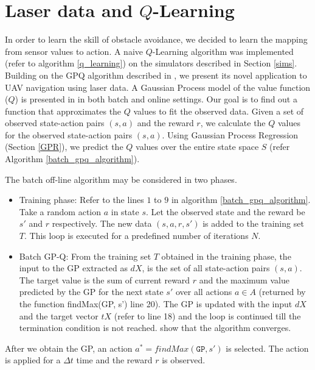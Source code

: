 \documentclass[12pt]{report}
\begin{document}
\section{Laser data and $Q$-Learning}
\label{laser_learning}
In order to learn the skill of obstacle avoidance, we decided to learn the mapping from sensor values to action. A naive $Q$-Learning algorithm was implemented (refer to algorithm \ref{q_learning}) on the simulators described in Section \ref{sims}. Building on the GPQ algorithm described in \cite{chowdhary2014off}, we present its novel application to UAV navigation using laser data.
A Gaussian Process model of the value function ($Q$) is presented in \cite{chowdhary2014off} in both batch and online settings. Our goal is to find out a function that approximates the $Q$ values to fit the observed data. Given a set of observed state-action pairs $(s,a)$ and the reward $r$, we calculate the $Q$ values for the observed state-action pairs $(s,a)$. Using Gaussian Process Regression (Section \ref{GPR}), we predict the $Q$ values over the entire state space $S$ (refer Algorithm \ref{batch_gpq_algorithm}).\par

The batch off-line algorithm may be considered in two phases.
 \begin{itemize}
\item Training phase: Refer to the lines $1$ to $9$ in algorithm \ref{batch_gpq_algorithm}. Take a random action $a$ in state $s$. Let the observed state and the reward be $s'$ and $r$ respectively. The new data $(s,a,r,s')$ is added to the training set $T$. This loop is executed for a predefined number of iterations $N$.
\item Batch GP-Q: From the training set $T$ obtained in the training phase, the input to the GP extracted as $dX$, is the set of all state-action pairs $(s,a)$. The target value is the sum of current reward $r$ and the maximum value predicted by the GP for the next state $s'$ over all actions $a \in A$ (returned by the function findMax(GP, s') line 20). The GP is updated with the input $dX$ and the target vector $tX$ (refer to line 18) and the loop is continued till the termination condition is not reached. \cite{chowdhary2014off} show that the algorithm converges.
\end{itemize}

After we obtain the GP, an action $a^* = \textit{findMax}(\texttt{GP},s')$ is selected. The action is applied for a $\Delta t$ time and the reward $r$ is observed.
\end{document}

